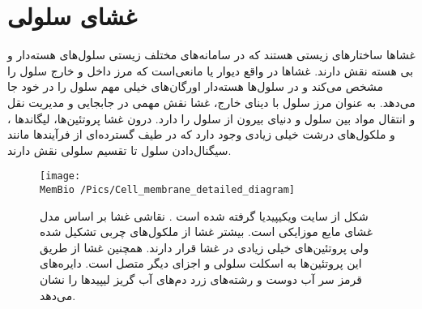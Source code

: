 \setRL


\section{\label{sec:cellmembrane}
غشای سلولی
}
غشاها ساختارهای زیستی هستند که در سامانه‌های مختلف زیستی سلول‌های هسته‌دار و بی هسته  نقش دارند. غشا‌ها در واقع دیوار یا مانعی‌است که مرز داخل و خارج سلول را مشخص می‌کند و در سلول‌ها هسته‌دار اورگان‌های خیلی مهم سلول را در خود جا می‌دهد. به عنوان مرز سلول با دینای خارج، غشا نقش مهمی در جابجایی و مدیریت نقل و انتقال مواد بین سلول و دنیای بیرون از سلول را دارد. درون غشا پروتئین‌ها، لیگاند‌ها
،
و ملکول‌های درشت خیلی زیادی وجود دارد که در طیف‌ گسترده‌ای از فرآیندها مانند سیگنال‌دادن سلول تا تقسیم سلولی نقش دارند.
\begin{figure}[h]
\begin{center}
\texttt{[image: \\MemBio /Pics/Cell\_membrane\_detailed\_diagram]}
\caption{
شکل از سایت ویکیپیدیا گرفته شده است
\cite{wikiCellMembrane}
. نقاشی غشا بر اساس مدل غشای مایع موزایکی است. بیشتر غشا از ملکول‌های چربی تشکیل شده ولی پروتئین‌های خیلی زیادی در غشا قرار دارند. همچنین غشا از طریق این پروتئین‌ها به اسکلت سلولی و اجزای دیگر متصل است. دایره‌های قرمز سر آب دوست و رشته‌های زرد دم‌های آب گریز لیپید‌ها را نشان می‌دهد.
}
\label{fig:fluidmembranemodel}
\end{center}
\end{figure}

